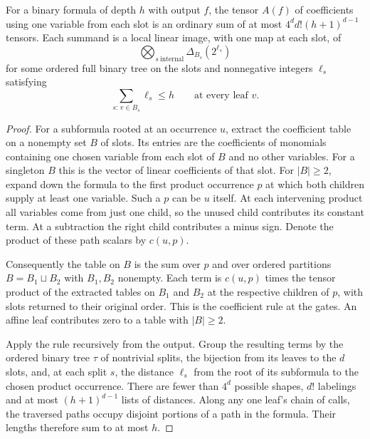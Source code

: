 \begin{lemma}\label{lem:formula-splits}
For a binary formula of depth $h$ with output $f$, the tensor $A(f)$
of coefficients using one variable from each slot is an ordinary sum
of at most $4^d d!(h+1)^{d-1}$ tensors. Each summand is a local linear
image, with one map at each slot, of
\[
                \bigotimes_{s\ \mathrm{internal}}\Delta_{B_s}(2^{\ell_s})
\]
for some ordered full binary tree on the slots and nonnegative integers
$\ell_s$ satisfying
\[
                \sum_{s:\,v\in B_s}\ell_s\le h
                \qquad\text{at every leaf }v .
\]
\end{lemma}

\begin{proof}
For a subformula rooted at an occurrence $u$, extract the coefficient
table on a nonempty set $B$ of slots. Its entries are the coefficients
of monomials containing one chosen variable from each slot of $B$
and no other variables. For a singleton $B$ this is the vector of
linear coefficients of that slot. For $|B|\ge2$, expand down the
formula to the first product occurrence $p$ at which both children
supply at least one variable. Such a $p$ can be $u$ itself.
At each intervening product all variables come from just one child,
so the unused child contributes its constant term. At a subtraction
the right child contributes a minus sign. Denote the product of these
path scalars by $c(u,p)$.

Consequently the table on $B$ is the sum over $p$ and over ordered
partitions $B=B_1\sqcup B_2$ with $B_1,B_2$ nonempty. Each term is
$c(u,p)$ times the tensor product of the extracted tables on $B_1$
and $B_2$ at the respective children of $p$, with slots returned to
their original order. This is the coefficient rule at the gates.
An affine leaf contributes zero to a table with $|B|\ge2$.

Apply the rule recursively from the output. Group the resulting terms
by the ordered binary tree $\tau$ of nontrivial splits, the bijection
from its leaves to the $d$ slots, and, at each split $s$, the distance
$\ell_s$ from the root of its subformula to the chosen product occurrence.
There are fewer than $4^d$ possible shapes, $d!$ labelings and at most
$(h+1)^{d-1}$ lists of distances. Along any one leaf's chain of
calls, the traversed paths occupy disjoint portions of a path in the
formula. Their lengths therefore sum to at most $h$.


\end{proof}
